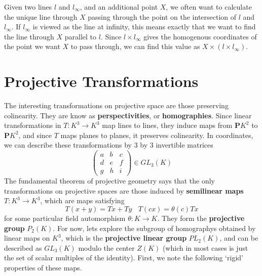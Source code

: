 \begin{example}
    Given two lines $l$ and $l_\infty$, and an additional point $X$, we often want to calculate the unique line through $X$ passing through the point on the intersection of $l$ and $l_\infty$. If $l_\infty$ is viewed as the line at infinity, this means exactly that we want to find the line through $X$ parallel to $l$. Since $l \times l_\infty$ gives the homogenous coordinates of the point we want $X$ to pass through, we can find this value as $X \times (l \times l_\infty)$.
\end{example}

\section{Projective Transformations}

The interesting transformations on projective space are those preserving colinearity. They are know as {\bf perspectivities}, or {\bf homographies}. Since linear transformations in $T: K^3 \to K^3$ map lines to lines, they induce maps from $\mathbf{P}K^2$ to $\mathbf{P}K^2$, and since $T$ maps planes to planes, it preserves colinearity. In coordinates, we can describe these transformations by 3 by 3 invertible matrices
%
\[ \begin{pmatrix} a & b & c \\ d & e & f \\ g & h & i \end{pmatrix} \in GL_3(K) \]
%
The fundamental theorem of projective geometry says that the only transformations on projective spaces are those induced by {\bf semilinear maps} $T: K^3 \to K^3$, which are maps satisfying
%
\[ T(x + y) = Tx + Ty\ \ \ \ T(cx) = \theta(c) Tx \]
%
for some particular field automorphism $\theta: K \to K$. They form the {\bf projective group} $P_2(K)$. For now, lets explore the subgroup of homographys obtained by linear maps on $K^3$, which is the {\bf projective linear group} $PL_2(K)$, and can be described as $GL_3(K)$ modulo the center $Z(K)$ (which in most cases is just the set of scalar multiples of the identity). First, we note the following `rigid' properties of these maps.


